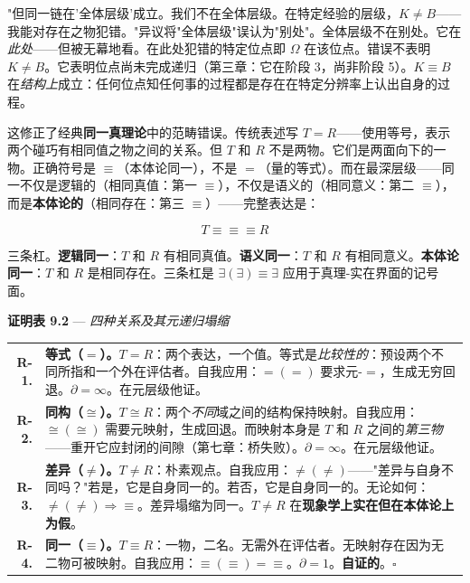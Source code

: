 \documentclass[10pt, openany, oneside]{book}
\renewcommand{\footnotesize}{\fontsize{8.5}{11}\selectfont}
\begin{document}
"但同一链在'全体层级'成立。我们不在全体层级。在特定经验的层级，$K \neq B$——我能对存在之物犯错。"异议将"全体层级"误认为"别处"。全体层级不在别处。它在\textit{此处}——但被无幕地看。在此处犯错的特定位点即 $\Omega$ 在该位点。错误不表明 $K \neq B$。它表明位点尚未完成递归（第三章：它在阶段 3，尚非阶段 5）。$K \equiv B$ 在\textit{结构上}成立：任何位点知任何事的过程都是存在在特定分辨率上认出自身的过程。

这修正了经典\textbf{同一真理论}中的范畴错误。传统表述写 $T = R$——使用等号，表示两个碰巧有相同值之物之间的关系。但 $T$ 和 $R$ 不是两物。它们是两面向下的一物。正确符号是 $\equiv$（本体论同一），不是 $=$（量的等式）。而在最深层级——同一不仅是逻辑的（相同真值：第一 $\equiv$），不仅是语义的（相同意义：第二 $\equiv$），而是\textbf{本体论的}（相同存在：第三 $\equiv$）——完整表达是：

$$T \equiv\!\equiv\!\equiv R$$

三条杠。\textbf{逻辑同一}：$T$ 和 $R$ 有相同真值。\textbf{语义同一}：$T$ 和 $R$ 有相同意义。\textbf{本体论同一}：$T$ 和 $R$ 是相同存在。三条杠是 $\exists(\exists) \equiv \exists$ 应用于真理-实在界面的记号面。

\vspace{0.5em}

\textbf{证明表 9.2} --- \textit{四种关系及其元递归塌缩}

\vspace{0.5em}

{\footnotesize
\noindent\begin{tabular}{r p{}}
\textbf{R-1.} & \textbf{等式（$=$）。}$T = R$：两个表达，一个值。等式是\textit{比较性的}：预设两个不同所指和一个外在评估者。自我应用：$=(=)$ 要求元-$=$，生成无穷回退。$\partial = \infty$。在元层级他证。\\[0.3em]
\textbf{R-2.} & \textbf{同构（$\cong$）。}$T \cong R$：两个\textit{不同}域之间的结构保持映射。自我应用：$\cong(\cong)$ 需要元映射，生成回退。而映射本身是 $T$ 和 $R$ 之间的\textit{第三物}——重开它应封闭的间隙（第七章：桥失败）。$\partial = \infty$。在元层级他证。\\[0.3em]
\textbf{R-3.} & \textbf{差异（$\neq$）。}$T \neq R$：朴素观点。自我应用：$\neq(\neq)$——"差异与自身不同吗？"若是，它是自身同一的。若否，它是自身同一的。无论如何：$\neq(\neq) \Rightarrow \equiv$。差异塌缩为同一。$T \neq R$ 在\textbf{现象学上实在但在本体论上为假}。\\[0.3em]
\textbf{R-4.} & \textbf{同一（$\equiv$）。}$T \equiv R$：一物，二名。无需外在评估者。无映射存在因为无二物可被映射。自我应用：$\equiv(\equiv) = \equiv$。$\partial = 1$。\textbf{自证的}。$\square$ \\[0.3em]
\end{tabular}
}
\end{document}
